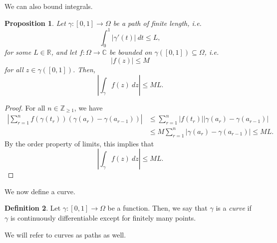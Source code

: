 \documentclass[a4paper, openany]{memoir}
\theoremstyle{definition}
\newtheorem{definition}{Definition}[section]
\theoremstyle{plain}
\newtheorem{proposition}[definition]{Proposition}
\begin{document}
We can also bound integrals.
\begin{proposition}
Let $\gamma: [0, 1] \to \Omega$ be a path of finite length, i.e.
\[\int_0^1 |\gamma'(t)| \ dt \leq L,\]
for some $L \in \mathbb{R}$, and let $f: \Omega \to \mathbb{C}$ be bounded on $\gamma([0, 1]) \subseteq \Omega$, i.e.
\[|f(z)| \leq M\]
for all $z \in \gamma([0, 1])$. Then,
\[\left|\int_\gamma f(z) \ dz\right| \leq ML.\]
\end{proposition}
\begin{proof}
For all $n \in \mathbb{Z}_{\geq 1}$, we have
\begin{align*}
    \left|\sum_{r=1}^n f(\gamma(t_r)) (\gamma(a_r) - \gamma(a_{r-1}))\right| &\leq \sum_{r=1}^n |f(t_r)| |\gamma(a_r) - \gamma(a_{r-1})| \\
    &\leq M \sum_{r=1}^n |\gamma(a_r) - \gamma(a_{r-1})| \leq ML.
\end{align*}
By the order property of limits, this implies that
\[\left|\int_\gamma f(z) \ dz\right| \leq ML.\]
\end{proof}

We now define a curve.
\begin{definition}
Let $\gamma: [0, 1] \to \Omega$ be a function. Then, we say that $\gamma$ is a \emph{curve} if $\gamma$ is continuously differentiable except for finitely many points.
\end{definition}
\noindent We will refer to curves as paths as well. 
\end{document}
